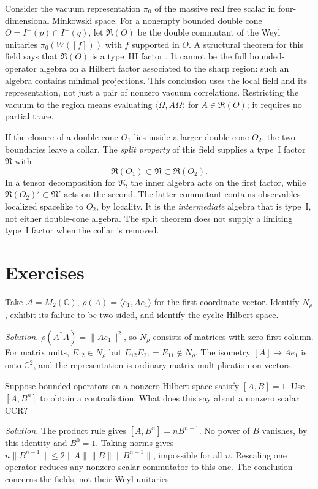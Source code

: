 Consider the vacuum representation $\pi_0$ of the massive real free scalar in four-dimensional Minkowski space. For a nonempty bounded double cone $O=I^+(p)\cap I^-(q)$, let $\mathfrak R(O)$ be the double commutant of the Weyl unitaries $\pi_0(W([f]))$ with $f$ supported in $O$. A structural theorem for this field says that $\mathfrak R(O)$ is a type~III factor \cite{Haag,Yngvason}. It cannot be the full bounded-operator algebra on a Hilbert factor associated to the sharp region: such an algebra contains minimal projections. This conclusion uses the local field and its representation, not just a pair of nonzero vacuum correlations. Restricting the vacuum to the region means evaluating $\langle\Omega,A\Omega\rangle$ for $A\in\mathfrak R(O)$; it requires no partial trace.

If the closure of a double cone $O_1$ lies inside a larger double cone $O_2$, the two boundaries leave a collar. The \emph{split property} of this field \cite{Haag,FewSplit} supplies a type~I factor $\mathfrak N$ with
\[
 \mathfrak R(O_1)\subset\mathfrak N\subset\mathfrak R(O_2).
\]
In a tensor decomposition for $\mathfrak N$, the inner algebra acts on the first factor, while $\mathfrak R(O_2)'\subset\mathfrak N'$ acts on the second. The latter commutant contains observables localized spacelike to $O_2$, by locality. It is the \emph{intermediate} algebra that is type~I, not either double-cone algebra. The split theorem does not supply a limiting type~I factor when the collar is removed.

\section*{Exercises}
\begin{exercise}
Take $\mathcal A=M_2(\mathbb C)$, $\rho(A)=\langle e_1,Ae_1\rangle$ for the first coordinate vector. Identify $N_\rho$, exhibit its failure to be two-sided, and identify the cyclic Hilbert space.
\end{exercise}
\noindent\emph{Solution.} $\rho(A^*A)=\|Ae_1\|^2$, so $N_\rho$ consists of matrices with zero first column. For matrix units, $E_{12}\in N_\rho$ but $E_{12}E_{21}=E_{11}\notin N_\rho$. The isometry $[A]\mapsto Ae_1$ is onto $\mathbb C^2$, and the representation is ordinary matrix multiplication on vectors.

\begin{exercise}
Suppose bounded operators on a nonzero Hilbert space satisfy $[A,B]=1$. Use $[A,B^n]$ to obtain a contradiction. What does this say about a nonzero scalar CCR?
\end{exercise}
\noindent\emph{Solution.} The product rule gives $[A,B^n]=nB^{n-1}$. No power of $B$ vanishes, by this identity and $B^0=1$. Taking norms gives $n\|B^{n-1}\|\le2\|A\|\|B\|\|B^{n-1}\|$, impossible for all $n$. Rescaling one operator reduces any nonzero scalar commutator to this one. The conclusion concerns the fields, not their Weyl unitaries.

